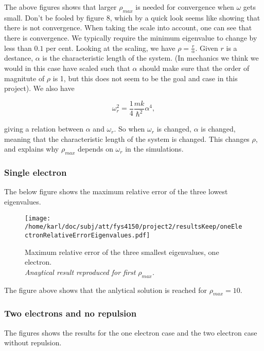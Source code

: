 \documentclass{article}
\begin{document}
The above figures shows that larger $\rho_{max}$ is needed for convergence when $\omega$ gets small. Don't be fooled by figure 8, which by a quick look seems like showing that there is not convergence. When taking the scale into account, one can see that there is convergence. We typically require the minimum eigenvalue to change by less than $0.1$ per cent. Looking at the scaling, we have $\rho = \frac{r}{\alpha}$. Given $r$ is a destance, $\alpha$ is the characteristic length of the system. (In mechanics we think we would in this case have scaled such that $\alpha$ should make sure that the order of magnitute of $\rho$ is 1, but this does not seem to be the goal and case in this project). We also have 

\begin{equation*}
\omega_r^2=\frac{1}{4}\frac{mk}{\hbar^2} \alpha^4,
\end{equation*}

giving a relation between $\alpha$ and $\omega_r$. So when $\omega_r$ is changed, $\alpha$ is changed, meaning that the characteristic length of the system is changed. This changes $\rho$, and explains why $\rho_{max}$ depends on $\omega_r$ in the simulations.

\subsubsection{Single electron}
The below figure shows the maximum relative error of the three lowest eigenvalues.


\begin{figure}[H]
	\centering
	\texttt{[image: /home/karl/doc/subj/att/fys4150/project2/resultsKeep/oneElectronRelativeErrorEigenvalues.pdf]}
	\caption{Maximum relative error of the three smallest eigenvalues, one electron.\\
		\textit{Anaytical result reproduced for first $\rho_{max}$.}}
	\label{1}
\end{figure}

The figure above shows that the anlytical solution is reached for $\rho_{max} = 10$. 

\subsubsection{Two electrons and no repulsion}
The figures shows the results for the one electron case and the two electron case without repulsion.
\end{document}
